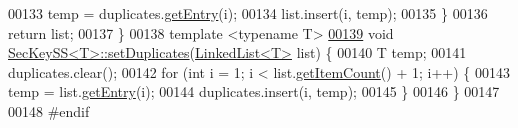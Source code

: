 \begin{DoxyCode}
00133         temp = duplicates.\hyperlink{classLinkedList_a341bfd7772c9d24d29eb7a7f3936915b}{getEntry}(i);
00134         list.insert(i, temp);
00135     \}
00136     \textcolor{keywordflow}{return} list;
00137 \}
00138 \textcolor{keyword}{template} <\textcolor{keyword}{typename} T>
\hyperlink{classSecKeySS_a95fdde8fc0b590359692784d15481dd4}{00139} \textcolor{keywordtype}{void} \hyperlink{classSecKeySS_a95fdde8fc0b590359692784d15481dd4}{SecKeySS<T>::setDuplicates}(\hyperlink{classLinkedList}{LinkedList<T>} list) \{
00140     T temp;
00141     duplicates.clear();
00142     \textcolor{keywordflow}{for} (\textcolor{keywordtype}{int} i = 1; i < list.\hyperlink{classLinkedList_afc6635f854f48f2f126cf3b60d845220}{getItemCount}() + 1; i++) \{
00143         temp = list.\hyperlink{classLinkedList_a341bfd7772c9d24d29eb7a7f3936915b}{getEntry}(i);
00144         duplicates.insert(i, temp);
00145     \}
00146 \}
00147 
00148 \textcolor{preprocessor}{#endif}
\end{DoxyCode}
